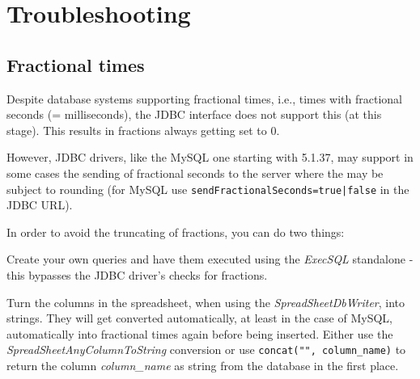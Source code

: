 \documentclass[a4paper]{book}
\begin{document}
\clearpage
\chapter{Troubleshooting}
\section{Fractional times}
Despite database systems supporting fractional times, i.e., times with
fractional seconds (= milliseconds), the JDBC interface does not support
this (at this stage). This results in fractions always getting set to 0.

However, JDBC drivers, like the MySQL one starting with 5.1.37, may support
in some cases the sending of fractional seconds to the server where the may
be subject to rounding (for MySQL use \texttt{sendFractionalSeconds=true|false}
in the JDBC URL).

In order to avoid the truncating of fractions, you can do two things:
\begin{tight_itemize}
  \item Create your own queries and have them executed using the \textit{ExecSQL}
  standalone - this bypasses the JDBC driver's checks for fractions.
  \item Turn the columns in the spreadsheet, when using the \textit{SpreadSheetDbWriter},
  into strings. They will get converted automatically, at least in the case
  of MySQL, automatically into fractional times again before being inserted.
  Either use the \textit{SpreadSheetAnyColumnToString} conversion or
  use \texttt{concat("", column\_name)} to return the column \textit{column\_name}
  as string from the database in the first place.
\end{tight_itemize}


\end{document}
